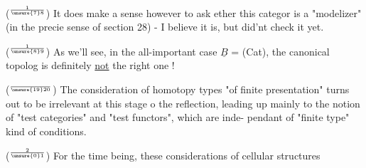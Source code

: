 ($^{1\over{\unsure{7}}{8}}$) It does make a sense however to ask ether this categor is a
"modelizer" (in the precie sense of section 28) - I believe it is, but
did'nt check it yet.

($^{1\over{\unsure{8}}{9}}$) As we'll see, in the all-important case $\underline{B}$ = (Cat), the canonical
topolog is definitely \uline{not} the right one !

($^{\over{\unsure{19}}{20}}$) The consideration of homotopy types "of finite presentation" turns
out to be irrelevant at this stage o the reflection, leading up mainly
to the notion of "test categories" and "test functors", which are inde-%
pendant of "finite type" kind of conditions.

($^{2\over{\unsure{0}}{1}}$) For the time being, these considerations of cellular structures

